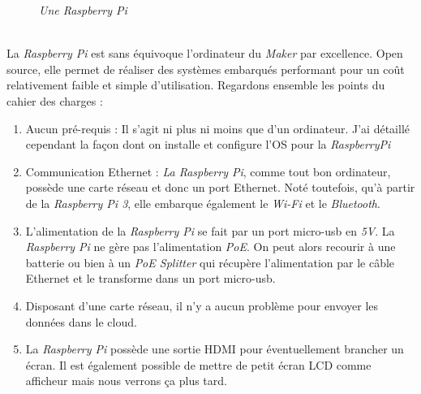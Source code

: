 \begin{figure}[H]
\begin{center}
\end{center}
		\caption{ \textit{Une Raspberry Pi}}
\end{figure}\\

La \textit{Raspberry Pi} est sans équivoque l'ordinateur du \textit{Maker} par excellence. Open source, elle permet de réaliser des systèmes embarqués performant pour un coût relativement faible et simple d'utilisation. Regardons ensemble les points du cahier des charges : 

\begin{enumerate}

\item Aucun pré-requis : Il s'agit ni plus ni moins que d'un ordinateur. J'ai détaillé cependant la façon dont on installe et configure l'OS pour la \textit{RaspberryPi}

\item Communication Ethernet : \textit{La Raspberry Pi}, comme tout bon ordinateur, possède une carte réseau et donc un port Ethernet. Noté toutefois, qu'à partir de la \textit{Raspberry Pi 3}, elle embarque également le \textit{Wi-Fi} et le \textit{Bluetooth}.

\item L'alimentation de la \textit{Raspberry Pi} se fait par un port micro-usb en \textit{5V}. La \textit{Raspberry Pi} ne gère pas l'alimentation \textit{PoE}. On peut alors recourir à une batterie ou bien à un \textit{PoE Splitter} qui récupère l'alimentation par le câble Ethernet et le transforme dans un port micro-usb.

\item Disposant d'une carte réseau, il n'y a aucun problème pour envoyer les données dans le cloud.

\item La \textit{Raspberry Pi} possède une sortie HDMI pour éventuellement brancher un écran. Il est également possible de mettre de petit écran LCD comme afficheur mais nous verrons ça plus tard.

\end{enumerate}

